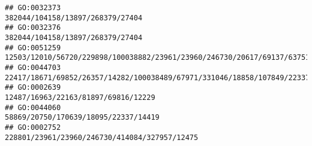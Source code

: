 \documentclass[
]{article}
\begin{document}
\begin{verbatim}
## GO:0032373                                                                                                                                                                                                                                                                                                                                                                             382044/104158/13897/268379/27404
## GO:0032376                                                                                                                                                                                                                                                                                                                                                                             382044/104158/13897/268379/27404
## GO:0051259                                                                                                                                                                                                                                                                                                      12503/12010/56720/229898/100038882/23961/23960/246730/20617/69137/637515/11720/16149/24115/12482/329064
## GO:0044703                                                                                                                                                                                                                                                                                                              22417/18671/69852/26357/14282/100038489/67971/331046/18858/107849/22337/15013/15018/11551/17986
## GO:0002639                                                                                                                                                                                                                                                                                                                                                                          12487/16963/22163/81897/69816/12229
## GO:0044060                                                                                                                                                                                                                                                                                                                                                                         58869/20750/170639/18095/22337/14419
## GO:0002752                                                                                                                                                                                                                                                                                                                                                                228801/23961/23960/246730/414084/327957/12475

\end{verbatim}
\end{document}
